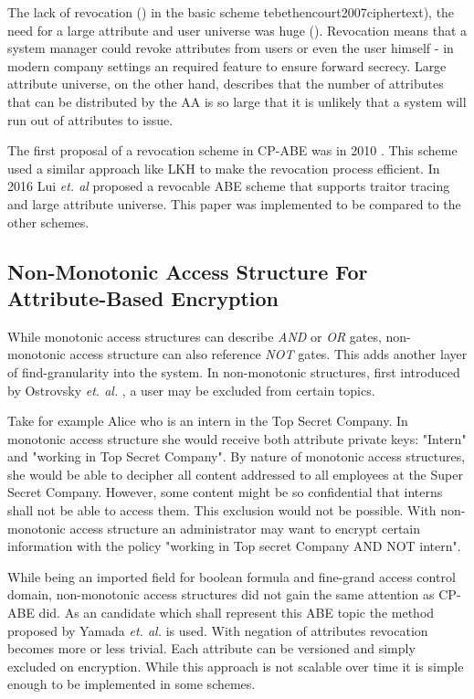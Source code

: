 The lack of revocation () in the basic scheme  	te{bethencourt2007ciphertext}), the need for a large attribute and user universe was huge (). Revocation means that a system manager could revoke attributes from users or even the user himself - in modern company settings an required feature to ensure forward secrecy. Large attribute universe, on the other hand, describes that the number of attributes that can be distributed by the \ac{AA} is so large that it is unlikely that a system will run out of attributes to issue. 

The first proposal of a revocation scheme in \ac{CP-ABE} was in 2010 \cite{liang2010ciphertext}. This scheme used a similar approach like \ac{LKH} to make the revocation process efficient. In 2016 Lui \textit{et. al} \cite{liu2016practical} proposed a revocable \ac{ABE} scheme that supports traitor tracing and large attribute universe. This paper was implemented to be compared to the other schemes.

\subsection{Non-Monotonic Access Structure For Attribute-Based Encryption}
While monotonic access structures can describe \textit{AND} or \textit{OR} gates, non-monotonic access structure can also reference \textit{NOT} gates. This adds another layer of find-granularity into the system. In non-monotonic structures, first introduced by Ostrovsky \textit{et. al.} \cite{Ostrovsky:2007:AEN:1315245.1315270}, a user may be excluded from certain topics. 

Take for example Alice who is an intern in the Top Secret Company. In monotonic access structure she would receive both attribute private keys: "Intern" and "working in Top Secret Company". By nature of monotonic access structures, she would be able to decipher all content addressed to all employees at the Super Secret Company. However, some content might be so confidential that interns shall not be able to access them. This exclusion would not be possible. With non-monotonic access structure an administrator may want to encrypt certain information with the policy "working in Top secret Company AND NOT intern".  

While being an imported field for boolean formula and fine-grand access control domain, non-monotonic access structures did not gain the same attention as \ac{CP-ABE} did. As an candidate which shall represent this \ac{ABE} topic the method proposed by Yamada \textit{et. al.} \cite{10.1007/978-3-642-54631-0_16} is used. With negation of attributes revocation becomes more or less trivial. Each attribute can be versioned and simply excluded on encryption. While this approach is not scalable over time it is simple enough to be implemented in some schemes.   

